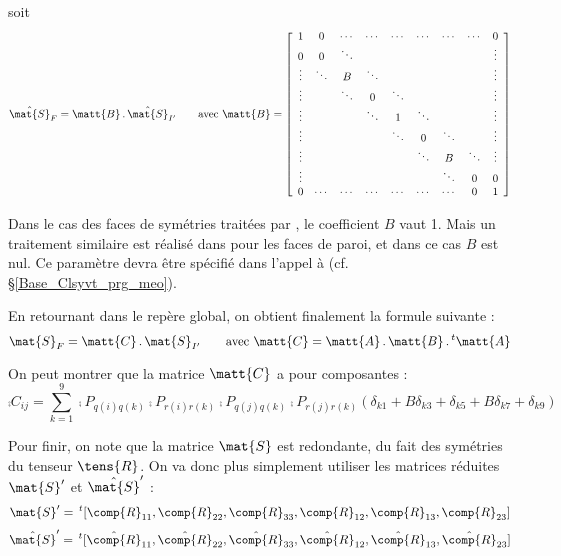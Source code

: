 soit
\renewcommand{\arraystretch}{0.5}
\begin{equation}
\hat{\mat{S}}_F=\matt{B}\,.\,\hat{\mat{S}}_{I'}
\qquad\text{avec }\matt{B}=
\left[\begin{array}{ccccccccc}
1&0&\cdots&\cdots&\cdots&\cdots&\cdots&\cdots&0\\
0&0&\ddots&&&&&&\vdots\\
\vdots&\ddots&B&\ddots&&&&&\vdots\\
\vdots&&\ddots&0&\ddots&&&&\vdots\\
\vdots&&&\ddots&1&\ddots&&&\vdots\\
\vdots&&&&\ddots&0&\ddots&&\vdots\\
\vdots&&&&&\ddots&B&\ddots&\vdots\\
\vdots&&&&&&\ddots&0&0\\
0&\cdots&\cdots&\cdots&\cdots&\cdots&\cdots&0&1
\end{array}\right]
\end{equation}
\renewcommand{\arraystretch}{1.}

Dans le cas des faces de sym\'etries trait\'ees par , le
coefficient $B$ vaut 1. Mais un traitement similaire est r\'ealis\'e dans
 pour les faces de paroi, et dans ce cas $B$ est nul. Ce
param\`etre devra \^etre sp\'ecifi\'e dans l'appel \`a 
(cf. \S\ref{Base_Clsyvt_prg_meo}).

En retournant dans le rep\`ere global, on obtient finalement la formule suivante
:
\begin{equation}
\label{Base_Clsyvt_eq_clsurS}
\mat{S}_F=\matt{C}\,.\,\mat{S}_{I'}\qquad
\text{avec }\matt{C}=\matt{A}\,.\,\matt{B}\,.\,^t\matt{A}
\end{equation}

On peut montrer que la matrice $\matt{C}$ a pour composantes :
\begin{equation}
\comp{C}_{ij}=\sum_{k=1}^9
\comp{P}_{q(i)q(k)}\comp{P}_{r(i)r(k)}\comp{P}_{q(j)q(k)}\comp{P}_{r(j)r(k)}
(\delta_{k1}+B\delta_{k3}+\delta_{k5}+B\delta_{k7}+\delta_{k9})
\end{equation}


Pour finir, on note que la matrice $\mat{S}$ est redondante, du fait des
sym\'etries du tenseur $\tens{R}$. On va donc plus simplement utiliser les
matrices r\'eduites $\mat{S}^\prime$ et $\hat{\mat{S}}^\prime$ :
\begin{equation}
\mat{S}^\prime=\,^t[\comp{R}_{11},\comp{R}_{22},\comp{R}_{33},
\comp{R}_{12},\comp{R}_{13},\comp{R}_{23}]
\end{equation}
\begin{equation}
\hat{\mat{S}}^\prime=\,^t[\hat{\comp{R}}_{11},\hat{\comp{R}}_{22},\hat{\comp{R}}_{33},
\hat{\comp{R}}_{12},\hat{\comp{R}}_{13},\hat{\comp{R}}_{23}]
\end{equation}

